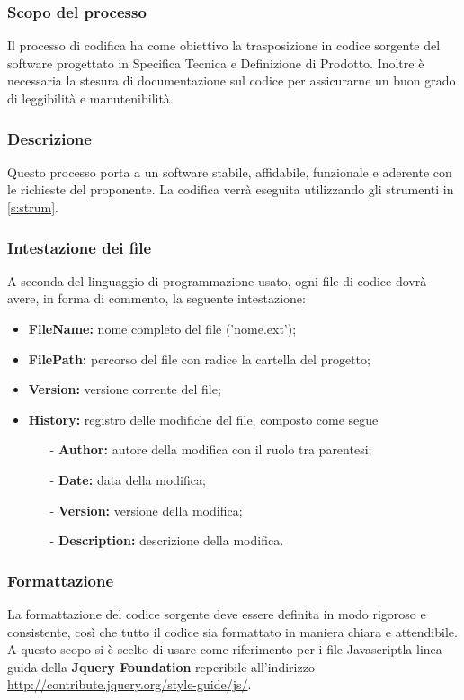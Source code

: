 \documentclass[a4paper,11pt]{article}
\begin{document}
			\subsubsection{Scopo del processo}
			Il processo di codifica ha come obiettivo la trasposizione in codice sorgente del software progettato in Specifica Tecnica e Definizione di Prodotto. Inoltre è necessaria la stesura di documentazione sul codice per assicurarne un buon grado di leggibilità e manutenibilità.
			\subsubsection{Descrizione}		
				Questo processo porta a un software stabile, affidabile, funzionale e aderente con le richieste del proponente. La codifica verrà eseguita utilizzando gli strumenti in \ref{s:strum}.
			
			\subsubsection{Intestazione dei file}		
			A seconda del linguaggio di programmazione usato, ogni file di codice dovrà avere, in forma di commento, la seguente intestazione:		
			
		\begin{itemize}
		\item \textbf{FileName:} nome completo del file ('nome.ext');
		\item \textbf{FilePath:} percorso del file con radice la cartella del progetto;
		\item \textbf{Version:} versione corrente del file;
		\item \textbf{History:} registro delle modifiche del file, composto come segue 
			\begin{itemize}
			\item[-] \textbf{Author:} autore della modifica con il ruolo tra parentesi;
			\item[-] \textbf{Date:} data della modifica;
			\item[-] \textbf{Version:} versione della modifica;
			\item[-] \textbf{Description:} descrizione della modifica.
			\end{itemize}	
		\end{itemize}
		
		\subsubsection{Formattazione}
		La formattazione del codice sorgente deve essere definita in modo rigoroso e consistente, così
che tutto il codice sia formattato in maniera chiara e attendibile. A questo scopo si è scelto di usare come riferimento per i file Javascript\addglos  la linea guida della \textbf{Jquery Foundation} reperibile all'indirizzo \url{http://contribute.jquery.org/style-guide/js/}.
\end{document}
